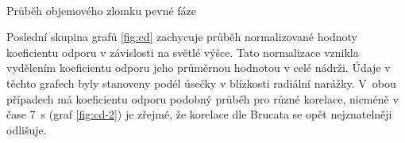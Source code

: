 \begin{grf}[h!]
 \centering
  \\ 
  \caption{Průběh objemového zlomku pevné fáze}
  \label{fig:vol}
\end{grf}
\newpage

Poslední skupina grafů \ref{fig:cd} zachycuje průběh normalizované hodnoty koeficientu odporu v závislosti na světlé výšce. Tato normalizace vznikla vydělením koeficientu odporu jeho průměrnou hodnotou v celé nádrži. Údaje v těchto grafech byly stanoveny podél úsečky v blízkosti radiální narážky.  V~obou případech má  koeficientu odporu podobný průběh pro různé korelace, nicméně v čase \SI{7}{\second} (graf \ref{fig:cd-2}) je zřejmé, že korelace dle Brucata se opět nejznatelněji odlišuje.

